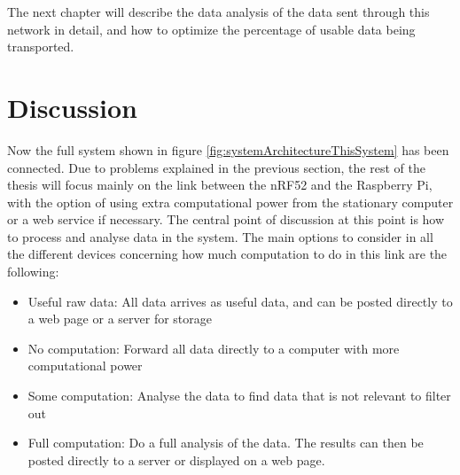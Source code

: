 \noindent The next chapter will describe the data analysis of the data sent through this network in detail, and how to optimize the percentage of usable data being transported.  

\newpage

\section{Discussion}

\noindent Now the full system shown in figure \ref{fig:systemArchitectureThisSystem} has been connected. Due to problems explained in the previous section, the rest of the thesis will focus mainly on the link between the \gls{nRF52} and the \gls{Raspberry Pi}, with the option of using extra computational power from the stationary computer or a web service if necessary. The central point of discussion at this point is how to process and analyse data in the system. The main options to consider in all the different devices concerning how much computation to do in this link are the following: 

\begin{itemize}
  \item Useful raw data: All data arrives as useful data, and can be posted directly to a web page or a server for storage
  \item No computation: Forward all data directly to a computer with more computational power
  \item Some computation: Analyse the data to find data that is not relevant to filter out
  \item Full computation: Do a full analysis of the data. The results can then be posted directly to a server or displayed on a web page. 
\end{itemize}

